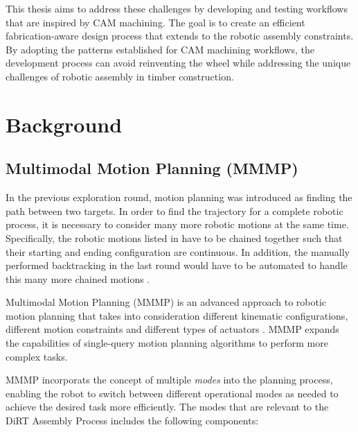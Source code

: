 This thesis aims to address these challenges by developing and testing workflows that are inspired by CAM machining. The goal is to create an efficient fabrication-aware design process that extends to the robotic assembly constraints. By adopting the patterns established for CAM machining workflows, the development process can avoid reinventing the wheel while addressing the unique challenges of robotic assembly in timber construction.

\vspace{2\baselineskip}

\FloatBarrier

\section{Background}
\label{section:exploration-3-background}

\subsection{Multimodal Motion Planning (MMMP)}
\label{subsection:exploration-3-multimodal-motion-planning-mmmp}

In the previous exploration round, motion planning was introduced as finding the path between two targets. In order to find the trajectory for a complete robotic process, it is necessary to consider many more robotic motions at the same time. Specifically, the robotic motions listed in  have to be chained together such that their starting and ending configuration are continuous. In addition, the manually performed backtracking in the last round would have to be automated to handle this many more chained motions . 

Multimodal Motion Planning (MMMP) is an advanced approach to robotic motion planning that takes into consideration different kinematic configurations, different motion constraints and different types of actuators \parencite{hauserMultimodalMotionPlanning2010, hauserRandomizedMultimodalMotion2011}. MMMP expands the capabilities of single-query motion planning algorithms  to perform more complex tasks.

MMMP incorporats the concept of multiple \textit{modes} into the planning process, enabling the robot to switch between different operational modes as needed to achieve the desired task more efficiently. The modes that are relevant to the DiRT Assembly Process includes the following components:

